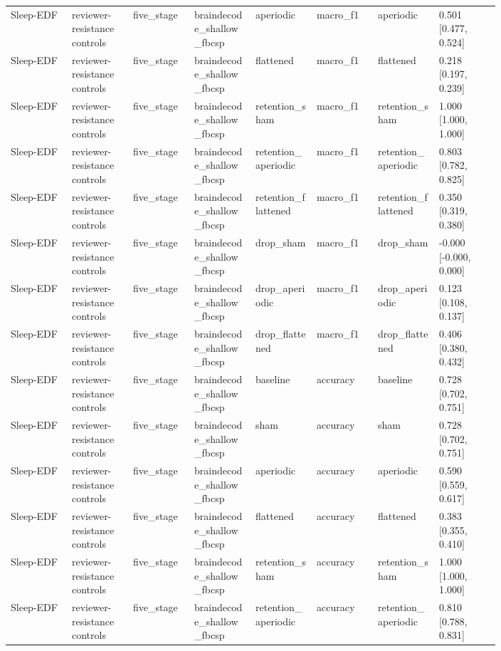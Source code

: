 \begin{longtable}{p{0.10\linewidth}p{0.10\linewidth}p{0.10\linewidth}p{0.10\linewidth}p{0.10\linewidth}p{0.10\linewidth}p{0.10\linewidth}p{0.10\linewidth}}
Sleep-EDF & reviewer-resistance controls & five\_stage & braindecode\_shallow\_fbcsp & aperiodic & macro\_f1 & aperiodic & 0.501 [0.477, 0.524]\\
Sleep-EDF & reviewer-resistance controls & five\_stage & braindecode\_shallow\_fbcsp & flattened & macro\_f1 & flattened & 0.218 [0.197, 0.239]\\
Sleep-EDF & reviewer-resistance controls & five\_stage & braindecode\_shallow\_fbcsp & retention\_sham & macro\_f1 & retention\_sham & 1.000 [1.000, 1.000]\\
Sleep-EDF & reviewer-resistance controls & five\_stage & braindecode\_shallow\_fbcsp & retention\_aperiodic & macro\_f1 & retention\_aperiodic & 0.803 [0.782, 0.825]\\
Sleep-EDF & reviewer-resistance controls & five\_stage & braindecode\_shallow\_fbcsp & retention\_flattened & macro\_f1 & retention\_flattened & 0.350 [0.319, 0.380]\\
Sleep-EDF & reviewer-resistance controls & five\_stage & braindecode\_shallow\_fbcsp & drop\_sham & macro\_f1 & drop\_sham & -0.000 [-0.000, 0.000]\\
Sleep-EDF & reviewer-resistance controls & five\_stage & braindecode\_shallow\_fbcsp & drop\_aperiodic & macro\_f1 & drop\_aperiodic & 0.123 [0.108, 0.137]\\
Sleep-EDF & reviewer-resistance controls & five\_stage & braindecode\_shallow\_fbcsp & drop\_flattened & macro\_f1 & drop\_flattened & 0.406 [0.380, 0.432]\\
Sleep-EDF & reviewer-resistance controls & five\_stage & braindecode\_shallow\_fbcsp & baseline & accuracy & baseline & 0.728 [0.702, 0.751]\\
Sleep-EDF & reviewer-resistance controls & five\_stage & braindecode\_shallow\_fbcsp & sham & accuracy & sham & 0.728 [0.702, 0.751]\\
Sleep-EDF & reviewer-resistance controls & five\_stage & braindecode\_shallow\_fbcsp & aperiodic & accuracy & aperiodic & 0.590 [0.559, 0.617]\\
Sleep-EDF & reviewer-resistance controls & five\_stage & braindecode\_shallow\_fbcsp & flattened & accuracy & flattened & 0.383 [0.355, 0.410]\\
Sleep-EDF & reviewer-resistance controls & five\_stage & braindecode\_shallow\_fbcsp & retention\_sham & accuracy & retention\_sham & 1.000 [1.000, 1.000]\\
Sleep-EDF & reviewer-resistance controls & five\_stage & braindecode\_shallow\_fbcsp & retention\_aperiodic & accuracy & retention\_aperiodic & 0.810 [0.788, 0.831]\\

\end{longtable}
